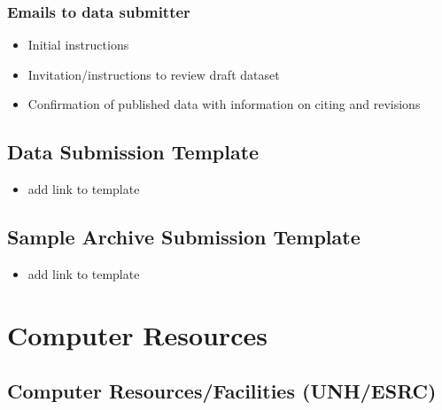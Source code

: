 \documentclass[
  letterpaper,
  DIV=11,
  numbers=noendperiod]{scrreprt}
\providecommand{\tightlist}{%
  \setlength{\itemsep}{0pt}\setlength{\parskip}{0pt}}\usepackage{longtable,booktabs,array}
\begin{document}
\subsection{Emails to data submitter}\label{emails-to-data-submitter}

\begin{itemize}
\tightlist
\item
  Initial instructions
\item
  Invitation/instructions to review draft dataset
\item
  Confirmation of published data with information on citing and
  revisions
\end{itemize}

\section{Data Submission Template}\label{data-submission-template}

\begin{itemize}
\tightlist
\item
  add link to template
\end{itemize}

\section{Sample Archive Submission
Template}\label{sample-archive-submission-template}

\begin{itemize}
\tightlist
\item
  add link to template
\end{itemize}


\chapter{Computer Resources}\label{computer-resources}

\section{Computer Resources/Facilities
(UNH/ESRC)}\label{computer-resourcesfacilities-unhesrc}
\end{document}
